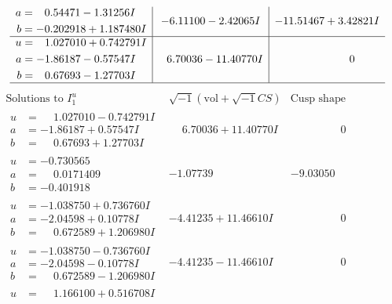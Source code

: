 \documentclass[1p]{elsarticle_modified}
\theoremstyle{definition}
\newcommand{\I}{\sqrt{-1}}
\begin{document}
$$\begin{array}{c|c|c}
\begin{aligned}
a &= \phantom{-}0.54471 - 1.31256 I \\
b &= -0.202918 + 1.187480 I\end{aligned}
 & -6.11100 - 2.42065 I & -11.51467 + 3.42821 I \\ \hline\begin{aligned}
u &= \phantom{-}1.027010 + 0.742791 I \\
a &= -1.86187 - 0.57547 I \\
b &= \phantom{-}0.67693 - 1.27703 I\end{aligned}
 & \phantom{-}6.70036 - 11.40770 I & \phantom{-0.000000 } 0\\
 \hline 
 \end{array}$$\newpage$$\begin{array}{c|c|c}  
\text{Solutions to }I^u_{1}& \I (\text{vol} + \sqrt{-1}CS) & \text{Cusp shape}\\
 \hline 
\begin{aligned}
u &= \phantom{-}1.027010 - 0.742791 I \\
a &= -1.86187 + 0.57547 I \\
b &= \phantom{-}0.67693 + 1.27703 I\end{aligned}
 & \phantom{-}6.70036 + 11.40770 I & \phantom{-0.000000 } 0 \\ \hline\begin{aligned}
u &= -0.730565\phantom{ +0.000000I} \\
a &= \phantom{-}0.0171409\phantom{ +0.000000I} \\
b &= -0.401918\phantom{ +0.000000I}\end{aligned}
 & -1.07739\phantom{ +0.000000I} & -9.03050\phantom{ +0.000000I} \\ \hline\begin{aligned}
u &= -1.038750 + 0.736760 I \\
a &= -2.04598 + 0.10778 I \\
b &= \phantom{-}0.672589 + 1.206980 I\end{aligned}
 & -4.41235 + 11.46610 I & \phantom{-0.000000 } 0 \\ \hline\begin{aligned}
u &= -1.038750 - 0.736760 I \\
a &= -2.04598 - 0.10778 I \\
b &= \phantom{-}0.672589 - 1.206980 I\end{aligned}
 & -4.41235 - 11.46610 I & \phantom{-0.000000 } 0 \\ \hline\begin{aligned}
u &= \phantom{-}1.166100 + 0.516708 I \\

\end{aligned}
\end{array}$$
\end{document}
